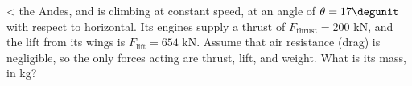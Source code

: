<%
the Andes, and is climbing at constant speed, at an angle of
$\theta =17\degunit$ with respect to horizontal.  Its engines
supply a thrust of $F_\text{thrust}=200$ kN, and the lift from
its wings is $F_\text{lift}=654$ kN.  Assume that air resistance
(drag) is negligible, so the only forces acting are thrust,
lift, and weight.  What is its mass, in kg?
